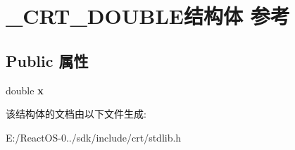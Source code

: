 \hypertarget{struct___c_r_t___d_o_u_b_l_e}{}\section{\+\_\+\+C\+R\+T\+\_\+\+D\+O\+U\+B\+L\+E结构体 参考}
\label{struct___c_r_t___d_o_u_b_l_e}
\subsection*{Public 属性}
\begin{DoxyCompactItemize}
\item 
\mbox{\label{struct___c_r_t___d_o_u_b_l_e_ab83091c6e4ef5c13cab749e4b58e11d4}} 
double {\bfseries x}
\end{DoxyCompactItemize}


该结构体的文档由以下文件生成\+:\begin{DoxyCompactItemize}
\item 
E\+:/\+React\+O\+S-\/0../sdk/include/crt/stdlib.\+h\end{DoxyCompactItemize}
